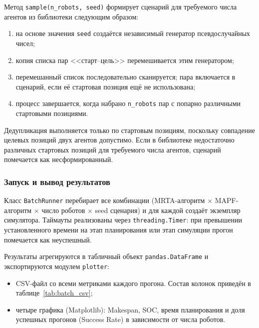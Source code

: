 Метод \texttt{sample(n\_robots, seed)} формирует сценарий для требуемого числа агентов из библиотеки следующим образом:

\begin{enumerate}[arabic]
    \item на основе значения \texttt{seed} создаётся независимый генератор псевдослучайных чисел;
    \item копия списка пар <<старт--цель>> перемешивается этим генератором;
    \item перемешанный список последовательно сканируется; пара включается в сценарий, если её стартовая позиция ещё не использована;
    \item процесс завершается, когда набрано \texttt{n\_robots} пар с попарно различными стартовыми позициями.
\end{enumerate}

Дедупликация выполняется только по стартовым позициям, поскольку совпадение целевых позиций двух агентов допустимо. Если в библиотеке недостаточно различных стартовых позиций для требуемого числа агентов, сценарий помечается как несформированный.

\subsubsection{Запуск и вывод результатов}

Класс \texttt{BatchRunner} перебирает все комбинации (MRTA-алгоритм $\times$ MAPF-алгоритм $\times$ число роботов $\times$ seed сценария) и для каждой создаёт экземпляр симулятора. Таймауты реализованы через \texttt{threading.Timer}: при превышении установленного времени на этап планирования или этап симуляции прогон помечается как неуспешный.

Результаты агрегируются в табличный объект \texttt{pandas.DataFrame} и экспортируются модулем \texttt{plotter}:

\begin{itemize}
    \item CSV-файл со всеми метриками каждого прогона. Состав колонок приведён в таблице~\ref{tab:batch_csv};
    \item четыре графика (Matplotlib): Makespan, SOC, время планирования и доля успешных прогонов (Success Rate) в зависимости от числа роботов.
\end{itemize}


